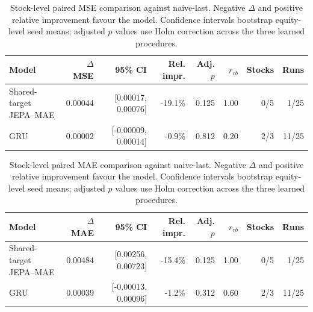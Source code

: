 \begin{table}[t]
\centering
\small
\caption{Stock-level paired MSE comparison against naive-last. Negative $\Delta$ and positive relative improvement favour the model. Confidence intervals bootstrap equity-level seed means; adjusted $p$ values use Holm correction across the three learned procedures.}
\label{tab:paired_mse_naive}
\begin{tabular}{lrrrrrrr}
\toprule
Model & $\Delta$MSE & 95\% CI & Rel. impr. & Adj. $p$ & $r_{rb}$ & Stocks & Runs \\
\midrule
Shared-target JEPA--MAE & 0.00044 & [0.00017, 0.00076] & -19.1\% & 0.125 & 1.00 & 0/5 & 1/25 \\
GRU & 0.00002 & [-0.00009, 0.00014] & -0.9\% & 0.812 & 0.20 & 2/3 & 11/25 \\
\bottomrule
\end{tabular}
\end{table}

\begin{table}[t]
\centering
\small
\caption{Stock-level paired MAE comparison against naive-last. Negative $\Delta$ and positive relative improvement favour the model. Confidence intervals bootstrap equity-level seed means; adjusted $p$ values use Holm correction across the three learned procedures.}
\label{tab:paired_mae_naive}
\begin{tabular}{lrrrrrrr}
\toprule
Model & $\Delta$MAE & 95\% CI & Rel. impr. & Adj. $p$ & $r_{rb}$ & Stocks & Runs \\
\midrule
Shared-target JEPA--MAE & 0.00484 & [0.00256, 0.00723] & -15.4\% & 0.125 & 1.00 & 0/5 & 1/25 \\
GRU & 0.00039 & [-0.00013, 0.00096] & -1.2\% & 0.312 & 0.60 & 2/3 & 11/25 \\
\bottomrule
\end{tabular}
\end{table}
